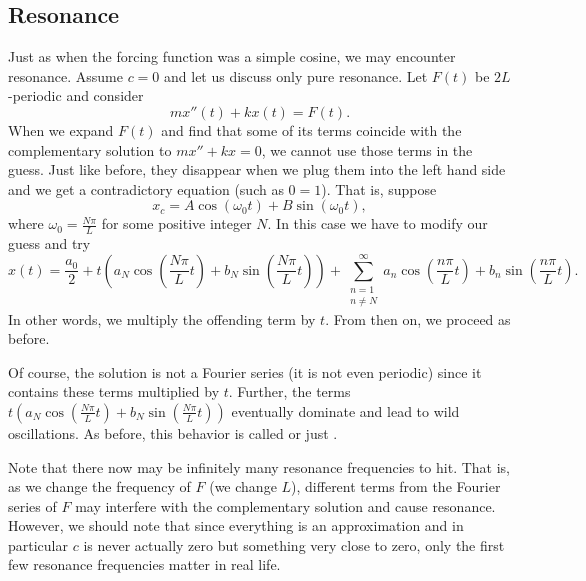 \subsection{Resonance}

Just as when the forcing function was a simple cosine, we may encounter
resonance.  Assume $c=0$ and let us discuss only pure resonance.
Let $F(t)$ be $2L$-periodic and consider
\begin{equation*}
m x''(t) + k x (t) = F(t) .
\end{equation*}
When we expand $F(t)$ and find that some of its terms coincide with the
complementary solution to $mx''+kx=0$, we cannot use those terms in the
guess.  Just like before, they disappear when we plug them into the left hand
side and we get a contradictory equation (such as $0=1$).   That is,
suppose
\begin{equation*}
x_c = A \cos (\omega_0 t) + B \sin (\omega_0 t), 
\end{equation*}
where $\omega_0 = \frac{N \pi}{L}$ for some positive integer $N$.
In this case we have
to modify our guess and try
\begin{equation*}
x(t) = \frac{a_0}{2} +
t \left(
a_N \cos \left( \frac{N \pi}{L} t \right) +
b_N \sin \left( \frac{N \pi}{L} t \right) \right) +
\sum_{\substack{n=1\\n\not= N}}^\infty
a_n \cos \left( \frac{n \pi}{L} t \right) +
b_n \sin \left( \frac{n \pi}{L} t \right) .
\end{equation*}
In other words, we multiply the offending term by $t$.  From then on, we
proceed as before.

Of course, the solution is not a Fourier series (it is not even
periodic) since it contains these terms multiplied by $t$.  Further, the
terms
$t \left( a_N \cos \left( \frac{N \pi}{L} t \right) +
b_N \sin \left( \frac{N \pi}{L} t \right) \right)$ eventually dominate and lead to
wild oscillations.  As before, this behavior is called \emph{} or just \emph{}.

Note that there now may be infinitely many resonance frequencies to hit.
That is, as we change the frequency of $F$ (we change $L$), different
terms from the Fourier series of $F$ may interfere with the complementary
solution and cause resonance.
However, we should note that since everything is an approximation and in
particular $c$ is never actually zero but something very close to zero,
only the first
few resonance frequencies matter in real life.

